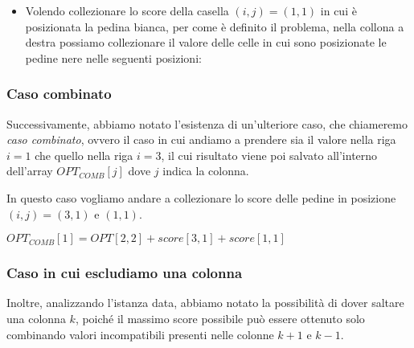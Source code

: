 \begin{itemize}
    \item {
        Volendo collezionare lo score della casella $(i, j) = (1, 1)$ in cui è posizionata la pedina bianca, per come è definito il problema, nella collona a destra possiamo collezionare il valore delle celle in cui sono posizionate le pedine nere nelle seguenti posizioni:
    \newline
    }
\end{itemize}

\subsubsection*{Caso combinato}

Successivamente, abbiamo notato l'esistenza di un'ulteriore caso, che chiameremo \textit{caso combinato}, ovvero il caso in cui andiamo a prendere sia 
il valore nella riga $i = 1$ che quello nella riga $i = 3$, il cui risultato viene poi salvato all'interno dell'array $OPT_{COMB}[j]$ dove $j$ indica la colonna.

In questo caso vogliamo andare a collezionare lo score delle pedine in posizione $(i, j) = (3, 1)$ e $(1, 1)$.

\chessboard[
    zero=false, %
    labelbottomformat=\arabic{filelabel},
    setpieces={Pa1, Pa3, pb2},
]

$OPT_{COMB}[1] = OPT[2, 2] + score[3, 1] + score[1, 1]$

\subsubsection*{Caso in cui escludiamo una colonna}

Inoltre, analizzando l'istanza data, abbiamo notato la possibilità di dover saltare una colonna $k$, poiché il massimo score possibile 
può essere ottenuto solo combinando valori incompatibili presenti nelle colonne $k+1$ e $k-1$.

